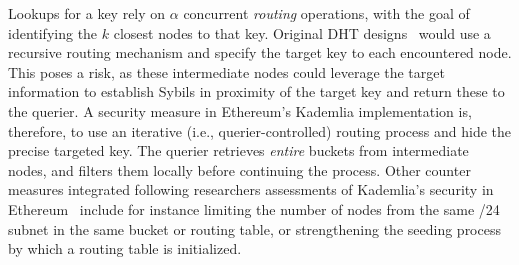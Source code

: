 Lookups for a key rely on $\alpha$ concurrent \emph{routing} operations, with the goal of identifying the $k$ closest nodes to that key.
Original DHT designs~\cite{maymounkov2002kademlia,chord,rowstron2001pastry} would use a recursive routing mechanism and specify the target key to each encountered node.
This poses a risk, as these intermediate nodes could leverage the target information to establish Sybils in proximity of the target key and return these to the querier.
A security measure in Ethereum's Kademlia implementation is, therefore, to use an iterative (i.e., querier-controlled) routing process and hide the precise targeted key.
The querier retrieves \emph{entire} buckets from intermediate nodes, and filters them locally before continuing the process.
Other counter measures integrated following researchers assessments of Kademlia's security in Ethereum~\cite{marcus2018low,henningsen2019eclipsing} include for instance limiting the number of nodes from the same /24 subnet in the same bucket or routing table, or strengthening the seeding process by which a routing table is initialized.

